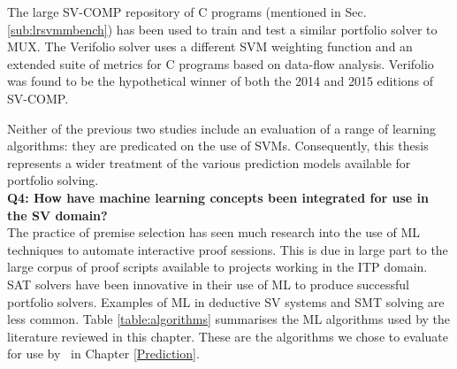 The large SV-COMP repository of C programs (mentioned in Sec. \ref{sub:lrsvmmbench}) has been used to train and test a similar portfolio solver to MUX. The Verifolio \cite{DPVZ15:CAV} solver uses a different SVM weighting function and an extended suite of metrics for C programs based on data-flow analysis. Verifolio was found to be the hypothetical winner of both the 2014 and 2015 editions of SV-COMP. 

Neither of the previous two studies include an evaluation of a range of learning algorithms: they are predicated on the use of SVMs. Consequently, this thesis represents a wider treatment of the various prediction models available for portfolio solving. \\

\textbf{Q4: How have machine learning concepts been integrated for use in the SV domain?} \\
The practice of premise selection has seen much research into the use of ML techniques to automate interactive proof sessions.
This is due in large part to the large corpus of proof scripts available to projects working in the ITP domain.
SAT solvers have been innovative in their use of ML to produce successful portfolio solvers.
Examples of ML in deductive SV systems and SMT solving are less common. 
Table \ref{table:algorithms} summarises the ML algorithms used by the literature reviewed in this chapter. These are the algorithms we chose to evaluate for use by \where~in Chapter \ref{Prediction}.

